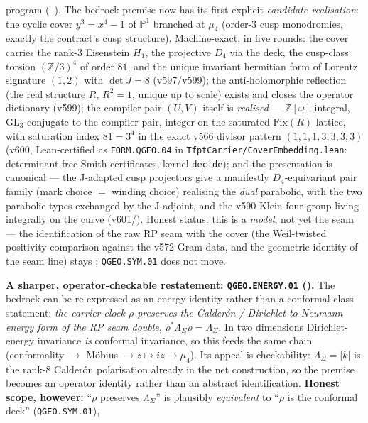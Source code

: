 \documentclass[11pt,a4paper]{article}
\newcommand{\PP}{\mathbb P^1}
\newcommand{\Z}{\mathbb Z}
\begin{document}
\begin{keybox}
{program (--).} The bedrock premise now
has its first explicit \emph{candidate realisation}: the cyclic cover $y^3=x^4-1$ of $\PP$ branched at
$\mu_4$ (order-$3$ cusp monodromies, exactly the contract's cusp structure).  Machine-exact, in five
rounds: the cover carries the rank-$3$ Eisenstein $H_1$, the projective $D_4$ via the deck, the
cusp-class torsion $(\Z/3)^4$ of order $81$, and the unique invariant hermitian form of Lorentz
signature $(1,2)$ with $\det J=8$ (v597/v599); the anti-holomorphic reflection (the real structure $R$,
$R^2{=}1$, unique up to scale) exists and closes the operator dictionary (v599); the compiler pair
$(U,V)$ itself is \emph{realised} --- $\mathbb{Z}[\omega]$-integral, GL$_3$-conjugate to the compiler
pair, integer on the saturated $\mathrm{Fix}(R)$ lattice, with saturation index $81=3^4$ in the exact
v566 divisor pattern $(1,1,1,3,3,3,3)$ (v600, Lean-certified as \texttt{FORM.QGEO.04} in
\texttt{TfptCarrier/CoverEmbedding.lean}: determinant-free Smith certificates, kernel \texttt{decide});
and the presentation is canonical --- the J-adapted cusp projectors give a manifestly $D_4$-equivariant
pair family (mark choice $=$ winding choice) realising the \emph{dual} parabolic, with the two parabolic
types exchanged by the J-adjoint, and the v590 Klein four-group living integrally on the curve
(v601/).  Honest status: this is a \emph{model}, not yet the seam --- the
identification of the raw RP seam with the cover (the Weil-twisted positivity comparison against the
v572 Gram data, and the geometric identity of the seam line) stays \mO; \texttt{QGEO.SYM.01} does not
move.
\par\smallskip\noindent\textbf{A sharper, operator-checkable restatement: \texttt{QGEO.ENERGY.01}
().} The bedrock can be re-expressed as an energy identity rather than a
conformal-class statement: \emph{the carrier clock $\rho$ preserves the Calder\'on / Dirichlet-to-Neumann
energy form of the RP seam double}, $\rho^*\Lambda_\Sigma\rho=\Lambda_\Sigma$. In two dimensions
Dirichlet-energy invariance \emph{is} conformal invariance, so this feeds the same chain
(conformality $\to$ M\"obius $\to z\mapsto iz\to\mu_4$). Its appeal is checkability: $\Lambda_\Sigma=|k|$
is the rank-$8$ Calder\'on polarisation already in the net construction, so the premise becomes an operator
identity rather than an abstract identification. \textbf{Honest scope, however:} ``$\rho$ preserves
$\Lambda_\Sigma$'' is plausibly \emph{equivalent} to ``$\rho$ is the conformal deck'' (\texttt{QGEO.SYM.01}),

\end{keybox}
\end{document}
